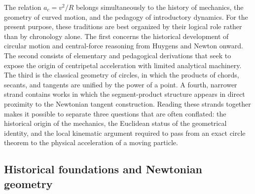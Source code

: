 \documentclass[preprint,12pt,3p,nopreprintline]{elsarticle}
\numberwithin{equation}{section}
\theoremstyle{remark}
\begin{document}
The relation $a_c=v^2/R$ belongs simultaneously to the history of mechanics, the geometry of curved motion, and the pedagogy of introductory dynamics. For the present purpose, these traditions are best organized by their logical role rather than by chronology alone. The first concerns the historical development of circular motion and central-force reasoning from Huygens and Newton onward. The second consists of elementary and pedagogical derivations that seek to expose the origin of centripetal acceleration with limited analytical machinery. The third is the classical geometry of circles, in which the products of chords, secants, and tangents are unified by the power of a point. A fourth, narrower strand contains works in which the segment-product structure appears in direct proximity to the Newtonian tangent construction. Reading these strands together makes it possible to separate three questions that are often conflated: the historical origin of the mechanics, the Euclidean status of the geometrical identity, and the local kinematic argument required to pass from an exact circle theorem to the physical acceleration of a moving particle.

\subsection{Historical foundations and Newtonian geometry}
\end{document}

